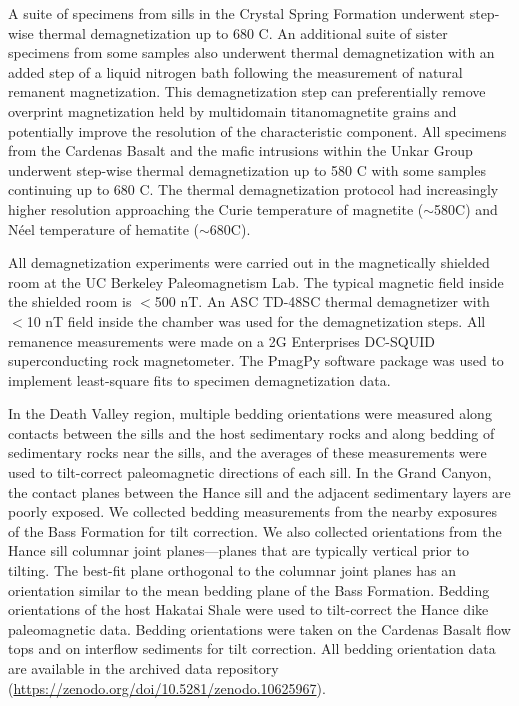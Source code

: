 A suite of specimens from sills in the Crystal Spring Formation underwent step-wise thermal demagnetization up to 680 \textdegree C. An additional suite of sister specimens from some samples also underwent thermal demagnetization with an added step of a liquid nitrogen bath following the measurement of natural remanent magnetization. This demagnetization step can preferentially remove overprint magnetization held by multidomain titanomagnetite grains and potentially improve the resolution of the characteristic component. All specimens from the Cardenas Basalt and the mafic intrusions within the Unkar Group underwent step-wise thermal demagnetization up to 580 \textdegree C with some samples continuing up to 680 \textdegree C. The thermal demagnetization protocol had increasingly higher resolution approaching the Curie temperature of magnetite ($\sim$580\textdegree C) and N\'eel temperature of hematite ($\sim$680\textdegree C).

All demagnetization experiments were carried out in the magnetically shielded room at the UC Berkeley Paleomagnetism Lab. The typical magnetic field inside the shielded room is $<$500 nT. An ASC TD-48SC thermal demagnetizer with $<$10 nT field inside the chamber was used for the demagnetization steps. All remanence measurements were made on a 2G Enterprises DC-SQUID superconducting rock magnetometer. The PmagPy software package \citep{Tauxe2016a} was used to implement least-square fits \citep{Kirschvink1980a} to specimen demagnetization data. 

In the Death Valley region, multiple bedding orientations were measured along contacts between the sills and the host sedimentary rocks and along bedding of sedimentary rocks near the sills, and the averages of these measurements were used to tilt-correct paleomagnetic directions of each sill. In the Grand Canyon, the contact planes between the Hance sill and the adjacent sedimentary layers are poorly exposed. We collected bedding measurements from the nearby exposures of the Bass Formation for tilt correction. We also collected orientations from the Hance sill columnar joint planes---planes that are typically vertical prior to tilting. The best-fit plane orthogonal to the columnar joint planes has an orientation similar to the mean bedding plane of the Bass Formation. Bedding orientations of the host Hakatai Shale were used to tilt-correct the Hance dike paleomagnetic data. Bedding orientations were taken on the Cardenas Basalt flow tops and on interflow sediments for tilt correction. All bedding orientation data are available in the archived data repository (\url{https://zenodo.org/doi/10.5281/zenodo.10625967}).

